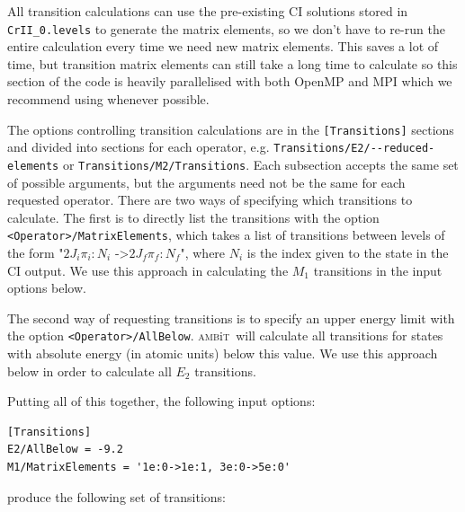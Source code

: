 \documentclass{report}
\newcommand{\ambit}{\textsc{amb}{\footnotesize i}\textsc{t}}
\begin{document}
All transition calculations can use the pre-existing CI solutions stored in \texttt{CrII\_0.levels} to 
generate the matrix elements, so we don't have to re-run the entire calculation every time we need new
matrix elements. This saves a lot of time, but transition matrix elements can still take a long time to
calculate so this section of the code is heavily parallelised with both OpenMP and MPI which we
recommend using whenever possible.

The options controlling transition calculations are in the \texttt{[Transitions]} sections and divided
into sections for each operator, e.g. \texttt{Transitions/E2/{-}{-}reduced-elements} or 
\texttt{Transitions/M2/Transitions}. Each subsection accepts the same set of possible arguments, but 
the arguments need not be the same for each requested operator. There are two ways of specifying which
transitions to calculate. The first is to directly list the transitions with the option
\texttt{<Operator>/MatrixElements}, which takes a list of transitions between levels of the form
"$2J_i\pi_i:N_i$ -\textgreater $2J_f\pi_f:N_f$", where $N_i$ is the index given to the state in the CI
output. We use this approach in calculating the $M_1$ transitions in the input options below.

The second way of requesting transitions is to specify an upper energy limit with the option
\texttt{<Operator>/AllBelow}. \ambit\  will calculate all transitions for states with absolute energy (in
atomic units) below this value. We use this approach below in order to calculate all $E_{2}$ 
transitions.

Putting all of this together, the following input options:

\begin{verbatim}
[Transitions]                                                                  
E2/AllBelow = -9.2                                                                
M1/MatrixElements = '1e:0->1e:1, 3e:0->5e:0'
\end{verbatim}

produce the following set of transitions:
\end{document}
